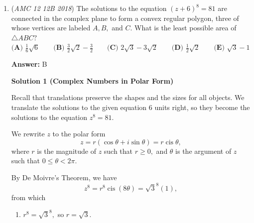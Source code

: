 \begin{enumerate}
 \textbf{Case 3: Ends in 2 modulo 3}

 There is one choice for the last digit. Then, $(a,b) = (1,0), (0,1), (2,2)$. Once again, there are $9,6,9$ ways, hence 24 cases.

 \textbf{Conjoinment:}

 The answer is $24+24+48 = 48+48 = \boxed{96}$.

 



\textbf{Solution 10 (Easiest?)}

We first find how many $3$-digit numbers dont have the digit $3$ in them. There are $900$ $3$-digit numbers. 
 \[\frac{8}{9} \times \frac{9}{10} \times \frac{9}{10} \times 900 = 900 \times \frac{18}{25} = 648.\]One third of numbers are divisible by $3$ so we multiply $648$ by $\frac{1}{3}$ which is equal $216$. Now we multiply by $\frac{4}{9}$ (because we are excluding $3$ so the last digit can be $0,1,2,4,\cdots,9$ so it is $\frac{4}{9}$ odd instead of $\frac{5}{10}$). 
 \[216 \times \frac{4}{9} = \boxed{96}\]~emotionaldamageguy

 


	\item (\textit{AMC 12 12B 2018}) The solutions to the equation $(z+6)^8=81$ are connected in the complex plane to form a convex regular polygon, three of whose vertices are labeled $A,B,$ and $C$. What is the least possible area of $\triangle ABC?$
$\textbf{(A) } \frac{1}{6}\sqrt{6} \qquad \textbf{(B) } \frac{3}{2}\sqrt{2}-\frac{3}{2} \qquad \textbf{(C) } 2\sqrt3-3\sqrt2 \qquad \textbf{(D) } \frac{1}{2}\sqrt{2} \qquad \textbf{(E) } \sqrt 3-1$

 \textbf{Answer: }B



\textbf{Solution 1 (Complex Numbers in Polar Form)}

Recall that translations preserve the shapes and the sizes for all objects. We translate the solutions to the given equation $6$ units right, so they become the solutions to the equation $z^8=81.$

 We rewrite $z$ to the polar form 
 \[z=r(\cos\theta+i\sin\theta)=r\operatorname{cis}\theta,\] where $r$ is the magnitude of $z$ such that $r\geq0,$ and $\theta$ is the argument of $z$ such that $0\leq\theta<2\pi.$

 By De Moivre's Theorem, we have 
 \[z^8=r^8\operatorname{cis}(8\theta)={\sqrt3}^8(1),\] from which

 
            \begin{enumerate} 
        \item $r^8={\sqrt3}^8,$ so $r=\sqrt3.$


\end{enumerate}
\end{enumerate}
